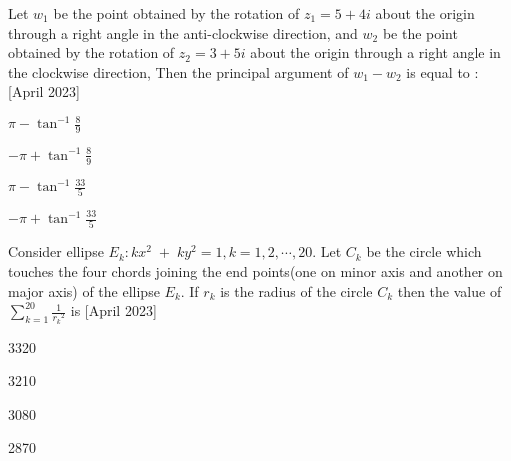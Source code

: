 \bigskip
\item Let $w_1$ be the point obtained by the rotation of $z_1=5+4i$ about the origin through a right angle in the anti-clockwise direction, and $w_2$ be the point obtained by the rotation of $z_2=3+5i$ about the origin through a right angle in the clockwise direction, Then the principal argument of $w_1-w_2$ is equal to : \hfill{[April 2023]}
\begin{enumerate}
    \begin{multicols}{4}
        \item $\pi-\tan^{-1}{\frac{8}{9}}$
        \item $-\pi+\tan^{-1}{\frac{8}{9}}$
        \item $\pi-\tan^{-1}{\frac{33}{5}}$
        \item $-\pi+\tan^{-1}{\frac{33}{5}}$
    \end{multicols}
\end{enumerate}
\bigskip
\item Consider ellipse $E_{k}:kx^2\;+\;ky^2=1,k=1,2,\cdots,20$. Let $C_k$ be the circle which touches the four chords joining the end points(one on minor axis and another on major axis) of the ellipse $E_k$. If $r_k$ is the radius of the circle $C_k$ then the value of $\sum_{k=1}^{20} \frac{1}{{r_k}^2}$ is \hfill{[April 2023]}
\begin{enumerate}
    \begin{multicols}{4}
        \item 3320
        \item 3210
        \item 3080
        \item 2870
    \end{multicols}
\end{enumerate}
